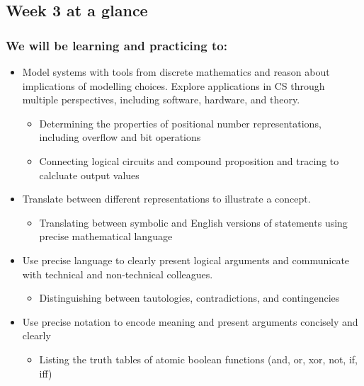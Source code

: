 \documentclass[12pt, oneside]{article}
\begin{document}
\begin{flushright}
\end{flushright} 
\subsection*{Week 3 at a glance}

\subsubsection*{We will be learning and practicing to:}
\begin{itemize}
\item Model systems with tools from discrete mathematics and reason about implications of modelling choices. Explore applications in CS through multiple perspectives, including software, hardware, and theory.
\begin{itemize}
    \item Determining the properties of positional number representations, including overflow and bit operations
   \item Connecting logical circuits and compound proposition and tracing to calcluate output values
\end{itemize}

\item Translate between different representations to illustrate a concept.
\begin{itemize}
   \item Translating between symbolic and English versions of statements using precise mathematical language
\end{itemize}

\item Use precise language to clearly present logical arguments and communicate with technical and non-technical colleagues.
\begin{itemize}
    \item Distinguishing between tautologies, contradictions, and contingencies
\end{itemize}

\item Use precise notation to encode meaning and present arguments concisely and clearly
\begin{itemize}
    \item Listing the truth tables of atomic boolean functions (and, or, xor, not, if, iff)
\end{itemize}


\end{itemize}
\end{document}
